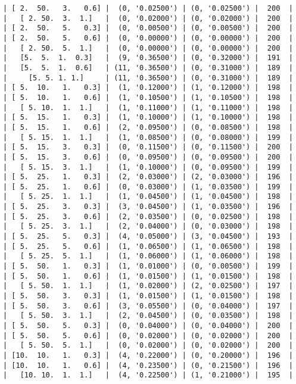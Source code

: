 \documentclass{article}
\begin{document}
\begin{verbatim}
| [ 2.  50.   3.   0.6] |  (0, '0.02500') | (0, '0.02500') |  200  |
|   [ 2. 50.  3.  1.]   |  (0, '0.02000') | (0, '0.02000') |  200  |
| [ 2.  50.   5.   0.3] |  (0, '0.00500') | (0, '0.00500') |  200  |
| [ 2.  50.   5.   0.6] |  (0, '0.00000') | (0, '0.00000') |  200  |
|   [ 2. 50.  5.  1.]   |  (0, '0.00000') | (0, '0.00000') |  200  |
|   [5.  5.  1.  0.3]   |  (9, '0.36500') | (0, '0.32000') |  191  |
|   [5.  5.  1.  0.6]   | (11, '0.36500') | (0, '0.31000') |  189  |
|     [5. 5. 1. 1.]     | (11, '0.36500') | (0, '0.31000') |  189  |
| [ 5.  10.   1.   0.3] |  (1, '0.12000') | (1, '0.12000') |  198  |
| [ 5.  10.   1.   0.6] |  (1, '0.10500') | (1, '0.10500') |  198  |
|   [ 5. 10.  1.  1.]   |  (1, '0.11000') | (1, '0.11000') |  198  |
| [ 5.  15.   1.   0.3] |  (1, '0.10000') | (1, '0.10000') |  198  |
| [ 5.  15.   1.   0.6] |  (2, '0.09500') | (0, '0.08500') |  198  |
|   [ 5. 15.  1.  1.]   |  (1, '0.08500') | (0, '0.08000') |  199  |
| [ 5.  15.   3.   0.3] |  (0, '0.11500') | (0, '0.11500') |  200  |
| [ 5.  15.   3.   0.6] |  (0, '0.09500') | (0, '0.09500') |  200  |
|   [ 5. 15.  3.  1.]   |  (1, '0.10000') | (0, '0.09500') |  199  |
| [ 5.  25.   1.   0.3] |  (2, '0.03000') | (2, '0.03000') |  196  |
| [ 5.  25.   1.   0.6] |  (0, '0.03000') | (1, '0.03500') |  199  |
|   [ 5. 25.  1.  1.]   |  (1, '0.04500') | (1, '0.04500') |  198  |
| [ 5.  25.   3.   0.3] |  (3, '0.04500') | (1, '0.03500') |  196  |
| [ 5.  25.   3.   0.6] |  (2, '0.03500') | (0, '0.02500') |  198  |
|   [ 5. 25.  3.  1.]   |  (2, '0.04000') | (0, '0.03000') |  198  |
| [ 5.  25.   5.   0.3] |  (4, '0.05000') | (3, '0.04500') |  193  |
| [ 5.  25.   5.   0.6] |  (1, '0.06500') | (1, '0.06500') |  198  |
|   [ 5. 25.  5.  1.]   |  (1, '0.06000') | (1, '0.06000') |  198  |
| [ 5.  50.   1.   0.3] |  (1, '0.01000') | (0, '0.00500') |  199  |
| [ 5.  50.   1.   0.6] |  (1, '0.01500') | (1, '0.01500') |  198  |
|   [ 5. 50.  1.  1.]   |  (1, '0.02000') | (2, '0.02500') |  197  |
| [ 5.  50.   3.   0.3] |  (1, '0.01500') | (1, '0.01500') |  198  |
| [ 5.  50.   3.   0.6] |  (3, '0.05500') | (0, '0.04000') |  197  |
|   [ 5. 50.  3.  1.]   |  (2, '0.04500') | (0, '0.03500') |  198  |
| [ 5.  50.   5.   0.3] |  (0, '0.04000') | (0, '0.04000') |  200  |
| [ 5.  50.   5.   0.6] |  (0, '0.02000') | (0, '0.02000') |  200  |
|   [ 5. 50.  5.  1.]   |  (0, '0.02000') | (0, '0.02000') |  200  |
| [10.  10.   1.   0.3] |  (4, '0.22000') | (0, '0.20000') |  196  |
| [10.  10.   1.   0.6] |  (4, '0.23500') | (0, '0.21500') |  196  |
|   [10. 10.  1.  1.]   |  (4, '0.22500') | (1, '0.21000') |  195  |

\end{verbatim}
\end{document}
